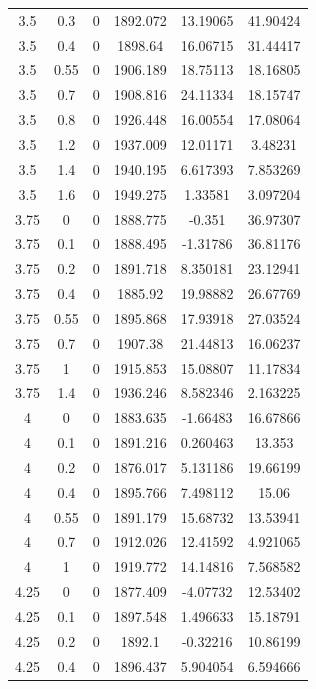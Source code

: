 \begin{longtable}{|c|c|c|c|c|c|}
	3.5   & 0.3   & 0     & 1892.072 & 13.19065 & 41.90424 \\
	3.5   & 0.4   & 0     & 1898.64 & 16.06715 & 31.44417 \\
	3.5   & 0.55  & 0     & 1906.189 & 18.75113 & 18.16805 \\
	3.5   & 0.7   & 0     & 1908.816 & 24.11334 & 18.15747 \\
	3.5   & 0.8   & 0     & 1926.448 & 16.00554 & 17.08064 \\
	3.5   & 1.2   & 0     & 1937.009 & 12.01171 & 3.48231 \\
	3.5   & 1.4   & 0     & 1940.195 & 6.617393 & 7.853269 \\
	3.5   & 1.6   & 0     & 1949.275 & 1.33581 & 3.097204 \\
	3.75  & 0     & 0     & 1888.775 & -0.351 & 36.97307 \\
	3.75  & 0.1   & 0     & 1888.495 & -1.31786 & 36.81176 \\
	3.75  & 0.2   & 0     & 1891.718 & 8.350181 & 23.12941 \\
	3.75  & 0.4   & 0     & 1885.92 & 19.98882 & 26.67769 \\
	3.75  & 0.55  & 0     & 1895.868 & 17.93918 & 27.03524 \\
	3.75  & 0.7   & 0     & 1907.38 & 21.44813 & 16.06237 \\
	3.75  & 1     & 0     & 1915.853 & 15.08807 & 11.17834 \\
	3.75  & 1.4   & 0     & 1936.246 & 8.582346 & 2.163225 \\
	4     & 0     & 0     & 1883.635 & -1.66483 & 16.67866 \\
	4     & 0.1   & 0     & 1891.216 & 0.260463 & 13.353 \\
	4     & 0.2   & 0     & 1876.017 & 5.131186 & 19.66199 \\
	4     & 0.4   & 0     & 1895.766 & 7.498112 & 15.06 \\
	4     & 0.55  & 0     & 1891.179 & 15.68732 & 13.53941 \\
	4     & 0.7   & 0     & 1912.026 & 12.41592 & 4.921065 \\
	4     & 1     & 0     & 1919.772 & 14.14816 & 7.568582 \\
	4.25  & 0     & 0     & 1877.409 & -4.07732 & 12.53402 \\
	4.25  & 0.1   & 0     & 1897.548 & 1.496633 & 15.18791 \\
	4.25  & 0.2   & 0     & 1892.1 & -0.32216 & 10.86199 \\
	4.25  & 0.4   & 0     & 1896.437 & 5.904054 & 6.594666 \\

\end{longtable}
